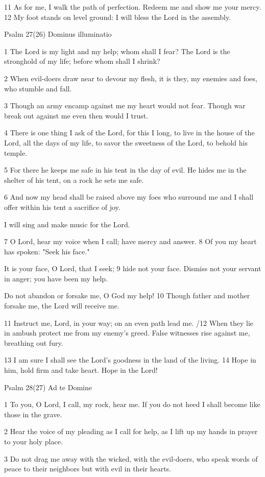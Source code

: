 11 As for me, I walk the path of perfection.
Redeem me and show me your mercy.
12 My foot stands on level ground:
I will bless the Lord in the assembly.


Psalm 27(26) Dominus illuminatio

1 The Lord is my light and my help;
whom shall I fear?
The Lord is the stronghold of my life;
before whom shall I shrink?

2 When evil-doers draw near
to devour my flesh,
it is they, my enemies and foes,
who stumble and fall.

3 Though an army encamp against me
my heart would not fear.
Though war break out against me
even then would I trust.

4 There is one thing I ask of the Lord,
for this I long,
to live in the house of the Lord,
all the days of my life,
to savor the sweetness of the Lord,
to behold his temple.

5 For there he keeps me safe in his tent
in the day of evil.
He hides me in the shelter of his tent,
on a rock he sets me safe.

6 And now my head shall be raised
above my foes who surround me
and I shall offer within his tent
a sacrifice of joy.

I will sing and make music for the Lord.

7 O Lord, hear my voice when I call;
have mercy and answer.
8 Of you my heart has spoken:
"Seek his face."

It is your face, O Lord, that I seek;
9 hide not your face.
Dismiss not your servant in anger;
you have been my help.

Do not abandon or forsake me,
O God my help!
10 Though father and mother forsake me,
the Lord will receive me.

11 Instruct me, Lord, in your way;
on an even path lead me.
/12 When they lie in ambush protect me
from my enemy's greed.
False witnesses rise against me,
breathing out fury.

13 I am sure I shall see the Lord's goodness
in the land of the living.
14 Hope in him, hold firm and take heart.
Hope in the Lord!


Psalm 28(27) Ad te Domine

1 To you, O Lord, I call,
my rock, hear me.
If you do not heed I shall become
like those in the grave.

2 Hear the voice of my pleading
as I call for help,
as I lift up my hands in prayer
to your holy place.

3 Do not drag me away with the wicked,
with the evil-doers,
who speak words of peace to their neighbors
but with evil in their hearts.

